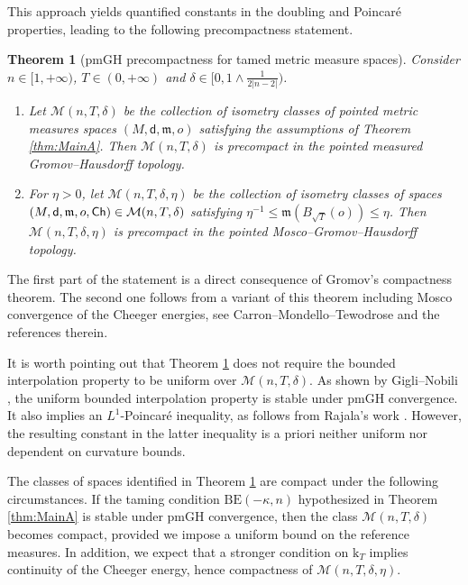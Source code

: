 \documentclass[10pt]{article}
\newcommand{\m}{\mathfrak{m}}
\renewcommand{\k}{\mathrm{k}}
\newcommand{\dist}{\mathsf{d}}
\newcommand{\Ch}{{\sf Ch}}
\newcommand{\BE}{{\mathrm{BE}}}
\theoremstyle{plain}
\newtheorem{theorem}{Theorem}[section]
\theoremstyle{definition}
\begin{document}
This approach yields quantified constants in the doubling and Poincaré properties, leading to the following precompactness statement.


\begin{theorem}[pmGH precompactness for tamed metric measure spaces]\label{th:MainB}
Consider $n \in [1,+\infty)$, $T \in (0,+\infty)$ and  $\delta \in [0, 1\wedge \frac{1}{2|n-2|})$.

\begin{enumerate}
    \item Let $\mathcal{M}(n,T,\delta)$ be the collection of isometry classes of pointed metric measures spaces $(M,\dist,\m,o)$ satisfying the assumptions of Theorem \ref{thm:MainA}. Then $\mathcal{M}(n,T,\delta)$ is precompact in the pointed measured Gromov--Hausdorff topology.
    \item For $\eta >0$, let $\mathcal{M}(n,T,\delta,\eta)$ be the collection of isometry classes of spaces $(M,\dist,\m,o,\Ch) \in \mathcal{M}(n,T,\delta)$ satisfying $\eta^{-1} \le \m(B_{\sqrt{T}}(o)) \le \eta$. Then $\mathcal{M}(n,T,\delta,\eta)$ is precompact in the pointed Mosco--Gromov--Hausdorff topology.
\end{enumerate}
\end{theorem}

The first part of the statement is a direct consequence of Gromov's compactness theorem. The second one follows from a variant of this theorem including Mosco convergence of the Cheeger energies, see Carron--Mondello--Tewodrose \cite[Theorem 1.17]{CMT} and the references therein. 

It is worth pointing out that Theorem \ref{th:MainB} does not require the bounded interpolation property to be uniform over $\mathcal{M}(n,T,\delta)$. As shown by Gigli--Nobili \cite{GigliNobili}, the uniform bounded interpolation property is stable under pmGH convergence. It also implies an $L^1$-Poincaré inequality, as follows from Rajala's work \cite{Rajala}. However, the resulting constant in the latter inequality is a priori neither uniform nor dependent on curvature bounds.

The classes of spaces identified in Theorem \ref{th:MainB} are compact under the following circumstances. If the taming condition $\BE(-\kappa,n)$ hypothesized in Theorem \ref{thm:MainA} is stable under pmGH convergence, then the class $\mathcal{M}(n,T,\delta)$ becomes compact, provided we impose a uniform bound on the reference measures. In addition, we expect that a stronger condition on $\k_T$ implies continuity of the Cheeger energy, hence compactness of $\mathcal{M}(n,T,\delta,\eta)$.
\end{document}
